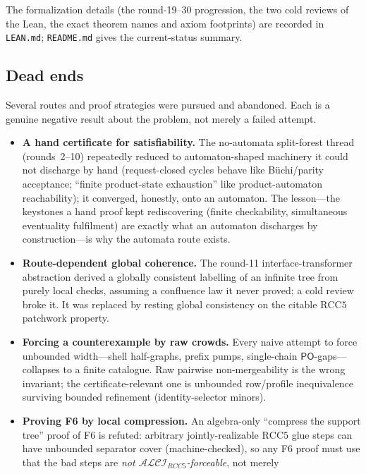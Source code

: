 \documentclass[
]{ceurart}
\theoremstyle{definition}
\newcommand{\ALCIRCC}[1]{\ensuremath{\mathcal{ALCI}_{\mathit{RCC#1}}}}
\newcommand{\PO}{\ensuremath{\mathsf{PO}}}
\begin{document}
The formalization details (the round-19--30 progression, the two cold
reviews of the Lean, the exact theorem names and axiom footprints) are
recorded in \texttt{LEAN.md}; \texttt{README.md} gives the current-status
summary.

\subsection{Dead ends}
\label{ssec:deadends}

Several routes and proof strategies were pursued and abandoned.  Each is
a genuine negative result about the problem, not merely a failed attempt.

\begin{itemize}
  \item \textbf{A hand certificate for satisfiability.}  The no-automata
    split-forest thread (rounds~2--10) repeatedly reduced to
    automaton-shaped machinery it could not discharge by hand
    (request-closed cycles behave like B\"uchi/parity acceptance; ``finite
    product-state exhaustion'' like product-automaton reachability); it
    converged, honestly, onto an automaton.  The lesson---the keystones a
    hand proof kept rediscovering (finite checkability, simultaneous
    eventuality fulfilment) are exactly what an automaton discharges by
    construction---is why the automata route exists.
  \item \textbf{Route-dependent global coherence.}  The round-11
    interface-transformer abstraction derived a globally consistent
    labelling of an infinite tree from purely local checks, assuming a
    confluence law it never proved; a cold review broke it.  It was
    replaced by resting global consistency on the citable $\mathrm{RCC5}$
    patchwork property.
  \item \textbf{Forcing a counterexample by raw crowds.}  Every naive
    attempt to force unbounded width---shell half-graphs, prefix pumps,
    single-chain $\PO$-gaps---collapses to a finite catalogue.  Raw
    pairwise non-mergeability is the wrong invariant; the
    certificate-relevant one is unbounded row/profile inequivalence
    surviving bounded refinement (identity-selector minors).
  \item \textbf{Proving F6 by local compression.}  An algebra-only
    ``compress the support tree'' proof of F6 is refuted: arbitrary
    jointly-realizable $\mathrm{RCC5}$ glue steps can have unbounded
    separator cover (machine-checked), so any F6 proof must use that the
    bad steps are \emph{not $\ALCIRCC{5}$-forceable}, not merely

\end{itemize}
\end{document}
